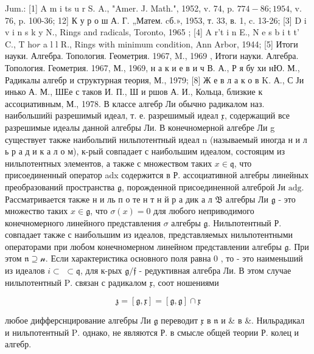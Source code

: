 \documentclass[10pt]{article}
\begin{document}
Jum.: [1] A m i ts u r S. A., "Amer. J. Math.", 1952, v. 74, p. $774-86 ; 1954$, v. 76, p. 100-36; 12] К у р о ш А. Г. „Матем. cб.», 1953, т. 33, в. 1, c. 13-26; [3] D i v i n s k y N., Rings and radicals, Toronto, 1965 ; [4] A r't i $\mathrm{n}$ E., $\mathrm{N}$ e s b i t t' C., T ho$r$ a l l R., Rings with minimum condition, Ann Arbor, 1944; [5] Итоги науки. Алгебра. Топология. Геометрия. 1967, M., 1969 , Итоги науки. Алгебра. Топология. Геометрия. 1967, М., 1969, н а к и е в и ч В. А., Р я бу хи нЮ. М., Радикалы алгебр и структурная теория, М., 1979; [8] Ж е в л а к о в K. А., С Ји инько А. М., ШЕе с таков И. П., Ш и ршов А. И., Кольца, близкие к ассоциативным, М., 1978. В классе алгебр Ли обычно радикалом наз. наибольшийі разрешимый идеал, т. е. разрешимый идеал $\mathfrak{x}$, содержащий все разрешимые идеалы данной алгебры Ли. В конечномерной алгебре Ли g существует также наибольпий нильпотентный идеал n (называемый иногда н и л ь р а д и к а л о м), к-рый совпадает с наибольшим идеалом, состояцим из нильпотентных элементов, а также с множеством таких $x \in \mathfrak{q}$, что присоединенный оператор adx содержится в Р. ассоциативной алгебры линейных преобразований пространства $\mathfrak{g}$, порожденной присоединенной алгеброй Ји $\mathrm{adg}$. Рассматривается также н и ль п о те н т н й р а дик а л $\mathfrak{B}$ алгебры Ли $\mathfrak{g}$ - это множество таких $x \in \mathfrak{g}$, что $\sigma(x)=0$ для любого неприводимого конечномерного линейного представления $\sigma$ алгебры $\mathfrak{g}$. Нильпотентный Р. совпадает также с наибольшим из идеалов, представляемых нильпотентными операторами при любом конечномерном линейном представлении алгебры $\mathfrak{g}$. При этом $\mathfrak{n} \supseteq \mathcal{n}$. Если характеристика основного поля равна 0 , то - это наименьший из идеалов $i \subset$ $\subset \mathfrak{q}$, для к-рых $\mathfrak{g} / \mathfrak{f}$ - редуктивная алгебра Ли. В этом случае нильпотентный $\mathrm{P}$. связан с радикалом $\mathfrak{x}$, соот ношениями



\[

\mathfrak{z}=[\mathfrak{g}, \mathfrak{x}]=[\mathfrak{g}, \mathfrak{g}] \cap \mathfrak{x}

\]



любое дифферснцирование алгебры Ли $\mathfrak{g}$ переводит $\mathfrak{x}$ в $\mathfrak{n}$ и \& в \&. Нильрадикал и нильпотентный $\mathrm{P}$. однако, не являются Р. в смысле общей теории Р. колец и алгебр.
\end{document}
